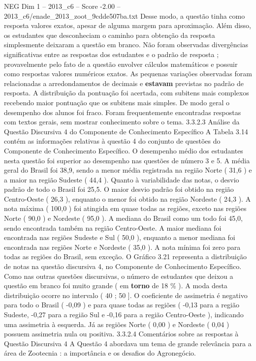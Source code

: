 \begin{textsample}{NEG Dim 1 – 2013\_c6 – Score -2.00 – 2013\_c6/enade\_2013\_zoot\_9cdde507ba.txt}
Desse modo, a questão tinha como resposta valores exatos, apesar de alguma margem para aproximação.
Além disso, os estudantes que desconheciam o caminho para obtenção da resposta simplesmente deixaram a questão em branco.
Não foram observadas divergências significativas entre as respostas dos estudantes e o padrão de resposta ; provavelmente pelo fato de a questão envolver cálculos matemáticos e possuir como respostas valores numéricos exatos.
As pequenas variações observadas foram relacionadas a arredondamentos de decimais e \textbf{estavam} previstas no padrão de resposta.
A distribuição da pontuação foi acertada, com subitens mais complexos recebendo maior pontuação que os subitens mais simples.
De modo geral o desempenho dos alunos foi fraco.
Foram frequentemente encontradas respostas com textos gerais, sem mostrar conhecimento sobre o tema. 3.3.2.3 Análise da Questão Discursiva 4 do Componente de Conhecimento Específico A Tabela 3.14 contém as informações relativas à questão 4 do conjunto de questões do Componente de Conhecimento Específico.
O desempenho médio dos estudantes nesta questão foi superior ao desempenho nas questões de número 3 e 5.
A média geral do Brasil foi 38,9, sendo a menor média registrada na região Norte ( 31,6 ) e a maior na região Sudeste ( 44,4 ).
Quanto à variabilidade das notas, o desvio padrão de todo o Brasil foi 25,5.
O maior desvio padrão foi obtido na região Centro-Oeste ( 26,3 ), enquanto o menor foi obtido na região Nordeste ( 24,3 ).
A nota máxima ( 100,0 ) foi atingida em quase todas as regiões, exceto nas regiões Norte ( 90,0 ) e Nordeste ( 95,0 ).
A mediana do Brasil como um todo foi 45,0, sendo encontrada também na região Centro-Oeste.
A maior mediana foi encontrada nas regiões Sudeste e Sul ( 50,0 ), enquanto a menor mediana foi encontrada nas regiões Norte e Nordeste ( 35,0 ).
A nota mínima foi zero para todas as regiões do Brasil, sem exceção.
O Gráfico 3.21 representa a distribuição de notas na questão discursiva 4, no Componente de Conhecimento Específico.
Como nas outras questões discursivas, o número de estudantes que deixou a questão em branco foi muito grande ( em \textbf{torno} de 18 \% ).
A moda desta distribuição ocorre no intervalo ( 40 ; 50 ].
O coeficiente de assimetria é negativo para todo o Brasil ( -0,09 ) e para quase todas as regiões ( -0,13 para a região Sudeste, -0,27 para a região Sul e -0,16 para a região Centro-Oeste ), indicando uma assimetria à esquerda.
Já as regiões Norte ( 0,00 ) e Nordeste ( 0,04 ) possuem assimetria nula ou positiva. 3.3.2.4 Comentários sobre as respostas à Questão Discursiva 4 A Questão 4 abordava um tema de grande relevância para a área de Zootecnia : a importância e os desafios do Agronegócio.

\end{textsample}
